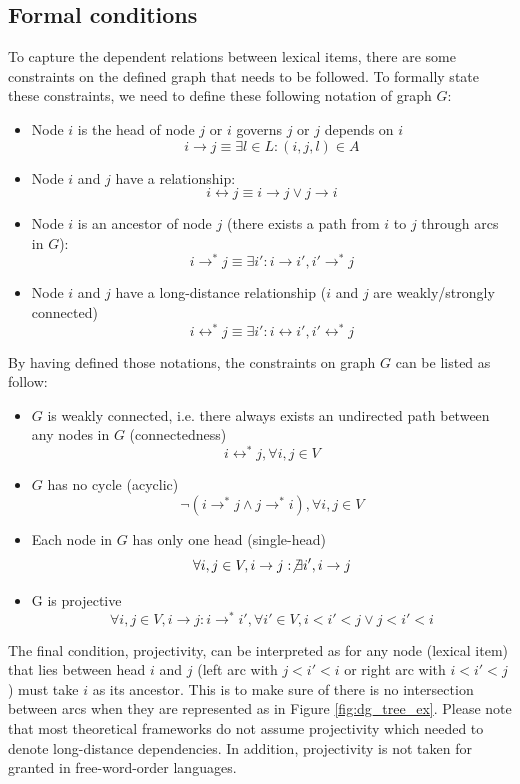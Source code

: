 \documentclass[12pt]{article}
\begin{document}
\subsection{Formal conditions}
To capture the dependent relations between lexical items, there are some constraints on the defined graph that needs to be followed. To formally state these constraints, we need to define these following notation of graph $G$:
\begin{itemize}
	\item Node $i$ is the head of node $j$ or $i$ governs $j$ or $j$ depends on $i$
		\[i\rightarrow j \equiv \exists l\in L: (i,j,l) \in A\]
	\item Node $i$ and $j$ have a relationship:
		\[i \leftrightarrow j \equiv i\rightarrow j \vee j\rightarrow i\]
	\item Node $i$ is an ancestor of node $j$ (there exists a path from $i$ to $j$ through arcs in $G$):
		\[i\rightarrow^* j \equiv \exists i': i\rightarrow i', i'\rightarrow^* j\]
	\item Node $i$ and $j$ have a long-distance relationship ($i$ and $j$ are weakly/strongly connected)
		\[i\leftrightarrow^* j \equiv \exists i': i\leftrightarrow i', i'\leftrightarrow^* j\]
\end{itemize}

By having defined those notations, the constraints on graph $G$ can be listed as follow:
\begin{itemize}
	\item $G$ is weakly connected, i.e. there always exists an undirected path between any nodes in $G$ (connectedness)
		\[i\leftrightarrow^* j, \forall i,j\in V\]
	\item $G$ has no cycle (acyclic)
		\[\neg(i\rightarrow^* j \wedge j\rightarrow^* i), \forall i,j\in V\]
	\item Each node in $G$ has only one head (single-head)
		\[\forall i, j\in V, i\rightarrow j: \not \exists i', i\rightarrow j\]
	\item G is projective
		\[\forall i,j\in V,i\rightarrow j: i\rightarrow^* i', \forall i'\in V,i<i'<j \vee j<i'<i\]
\end{itemize}
The final condition, projectivity, can be interpreted as for any node (lexical item) that lies between head $i$ and $j$ (left arc with $j<i'<i$ or right arc with $i<i'<j$) must take $i$ as its ancestor. This is to make sure of there is no intersection between arcs when they are represented as in Figure \ref{fig:dg_tree_ex}. Please note that most theoretical frameworks do not assume projectivity which needed to denote long-distance dependencies. In addition, projectivity is not taken for granted in free-word-order languages.
\end{document}
